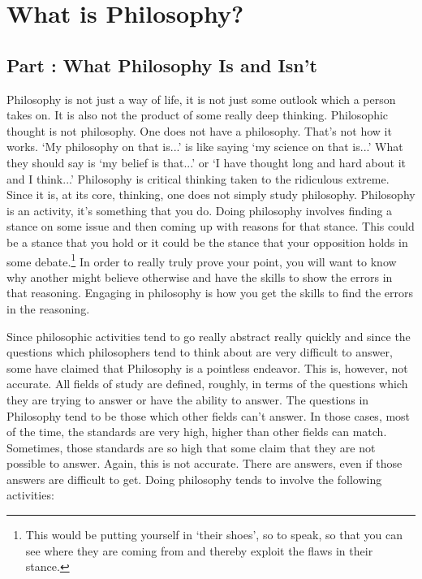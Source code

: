 \part{What is Philosophy?}
\label{ch.modone}

\chapter{Part \thechapcount: What Philosophy Is and Isn't}
Philosophy is not just a way of life, it is not just some outlook which a person takes on. It is also not the product of some really deep thinking. Philosophic thought is not philosophy. One does not have a philosophy. That's not how it works. `My philosophy on that is...' is like saying `my science on that is...' What they should say is `my belief is that...' or `I have thought long and hard about it and I think...' Philosophy is critical thinking taken to the ridiculous extreme. Since it is, at its core, thinking, one does not simply study philosophy. Philosophy is an activity, it's something that you do. Doing philosophy involves finding a stance on some issue and then coming up with reasons for that stance. This could be a stance that you hold or it could be the stance that your opposition holds in some debate.\footnote{This would be putting yourself in `their shoes', so to speak, so that you can see where they are coming from and thereby exploit the flaws in their stance.} In order to really truly prove your point, you will want to know why another might believe otherwise and have the skills to show the errors in that reasoning. Engaging in philosophy is how you get the skills to find the errors in the reasoning. 

Since philosophic activities tend to go really abstract really quickly and since the questions which philosophers tend to think about are very difficult to answer, some have claimed that Philosophy is a pointless endeavor. This is, however, not accurate. All fields of study are defined, roughly, in terms of the questions which they are trying to answer or have the ability to answer. The questions in Philosophy tend to be those which other fields can't answer. In those cases, most of the time, the standards are very high, higher than other fields can match. Sometimes, those standards are so high that some claim that they are not possible to answer. Again, this is not accurate. There are answers, even if those answers are difficult to get. Doing philosophy tends to involve the following activities:


